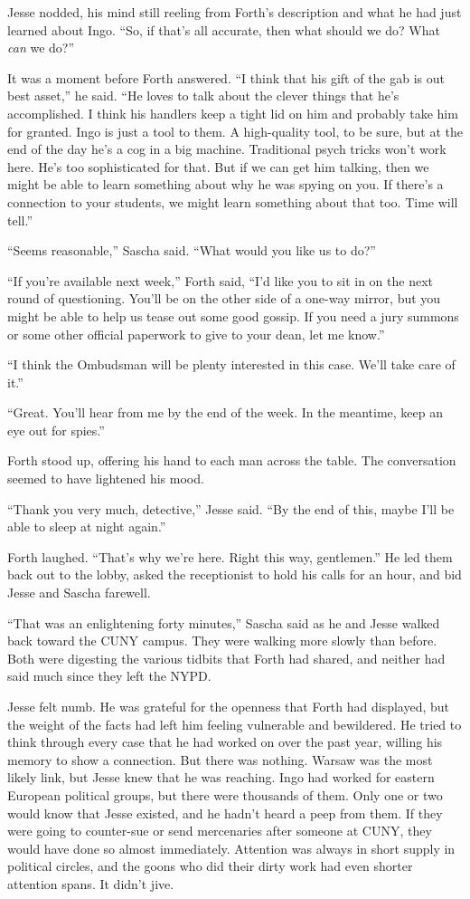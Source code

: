 \documentclass[12pt]{book}
\begin{document}
Jesse nodded, his mind still reeling from Forth's description and what he had just learned about Ingo.  ``So, if that's all accurate, then what should we do?  What \emph{can} we do?''

It was a moment before Forth answered.  ``I think that his gift of the gab is out best asset,'' he said.  ``He loves to talk about the clever things that he's accomplished.  I think his handlers keep a tight lid on him and probably take him for granted.  Ingo is just a tool to them.  A high-quality tool, to be sure, but at the end of the day he's a cog in a big machine.  Traditional psych tricks won't work here.  He's too sophisticated for that.  But if we can get him talking, then we might be able to learn something about why he was spying on you.  If there's a connection to your students, we might learn something about that too.  Time will tell.''

``Seems reasonable,'' Sascha said.  ``What would you like us to do?''

``If you're available next week,'' Forth said, ``I'd like you to sit in on the next round of questioning.  You'll be on the other side of a one-way mirror, but you might be able to help us tease out some good gossip.  If you need a jury summons or some other official paperwork to give to your dean, let me know.''

``I think the Ombudsman will be plenty interested in this case.  We'll take care of it.''

``Great.  You'll hear from me by the end of the week.  In the meantime, keep an eye out for spies.''

Forth stood up, offering his hand to each man across the table.  The conversation seemed to have lightened his mood.

``Thank you very much, detective,'' Jesse said.  ``By the end of this, maybe I'll be able to sleep at night again.''

Forth laughed.  ``That's why we're here.  Right this way, gentlemen.''  He led them back out to the lobby, asked the receptionist to hold his calls for an hour, and bid Jesse and Sascha farewell.


``That was an enlightening forty minutes,'' Sascha said as he and Jesse walked back toward the CUNY campus.  They were walking more slowly than before.  Both were digesting the various tidbits that Forth had shared, and neither had said much since they left the NYPD.

Jesse felt numb.  He was grateful for the openness that Forth had displayed, but the weight of the facts had left him feeling vulnerable and bewildered.  He tried to think through every case that he had worked on over the past year, willing his memory to show a connection.  But there was nothing.  Warsaw was the most likely link, but Jesse knew that he was reaching.  Ingo had worked for eastern European political groups, but there were thousands of them.  Only one or two would know that Jesse existed, and he hadn't heard a peep from them.  If they were going to counter-sue or send mercenaries after someone at CUNY, they would have done so almost immediately.  Attention was always in short supply in political circles, and the goons who did their dirty work had even shorter attention spans.  It didn't jive.
\end{document}
